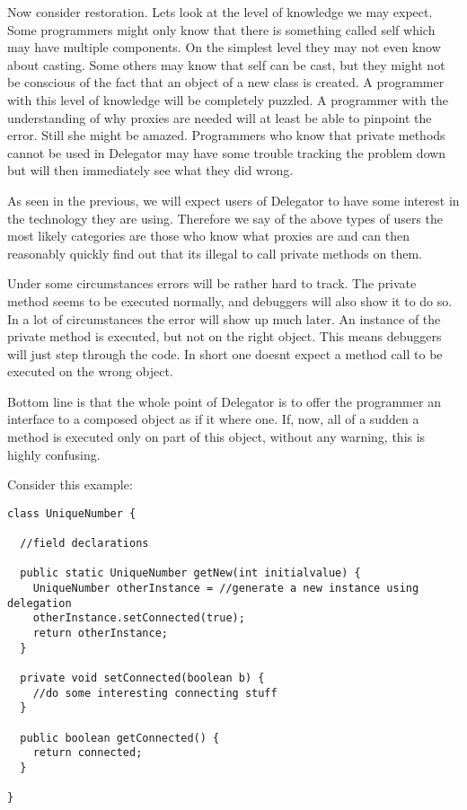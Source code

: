 \documentclass[a4paper,12pt]{book}
\begin{document}
Now consider restoration. Lets look at the level of knowledge we may expect. Some programmers might only know that there is something called self which may have multiple components. On the simplest level they may not even know about casting. Some others may know that self can be cast, but they might not be conscious of the fact that an object of a new class is created. A programmer with this level of knowledge will be completely puzzled. A programmer with the understanding of why proxies are needed will at least be able to pinpoint the error. Still she might be amazed. Programmers who know that private methods cannot be used in Delegator may have some trouble tracking the problem down but will then immediately see what they did wrong.

As seen in the previous, we will expect users of Delegator to have some interest in the technology they are using. Therefore we say of the above types of users the most likely categories are those who know what proxies are and can then reasonably quickly find out that its illegal to call private methods on them.

Under some circumstances errors will be rather hard to track. The private method seems to be executed normally, and debuggers will also show it to do so. In a lot of circumstances the error will show up much later. An instance of the private method is executed, but not on the right object. This means debuggers will just step through the code. In short one doesnt expect a method call to be executed on the wrong object.

Bottom line is that the whole point of Delegator is to offer the programmer an interface to a composed object as if it where one. If, now, all of a sudden a method is executed only on part of this object, without any warning, this is highly confusing.

Consider this example:

\begin{verbatim}
class UniqueNumber {

  //field declarations

  public static UniqueNumber getNew(int initialvalue) {
    UniqueNumber otherInstance = //generate a new instance using delegation
    otherInstance.setConnected(true);
    return otherInstance;
  }

  private void setConnected(boolean b) {
    //do some interesting connecting stuff
  }

  public boolean getConnected() {
    return connected;
  }
		
}
\end{verbatim}
\end{document}
